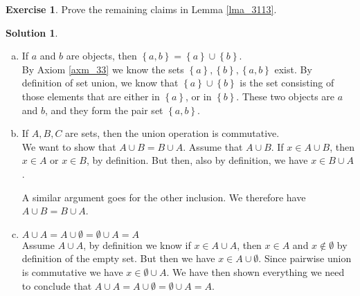 \documentclass[a4paper, twocolumn]{report}
\newcounter{exercise} \numberwithin{exercise}{section}
\theoremstyle{definition}
\newtheorem{exc}[exercise]{Exercise}
\theoremstyle{solution}
\newtheorem*{sltn}{Solution}
\newcommand{\union}{\cup}
\begin{document}
\begin{exc}
  Prove the remaining claims in Lemma \ref{lma_3113}.
\end{exc}
\begin{sltn}
  \begin{enumerate}[(a)]
    \item If $a$ and $b$ are objects, then $\left\{ a, b \right\} = \left\{ a \right\} \union \left\{ b \right\}$. \\
      [0.2cm]
      By Axiom \ref{axm_33} we know the sets $\left\{ a \right\}, \left\{ b
      \right\}, \left\{ a, b \right\}$ exist. By definition of set union, we
      know that $\left\{ a \right\} \union \left\{ b \right\}$ is the set
      consisting of those elements that are either in $\left\{ a \right\}$, or
      in $\left\{ b \right\}$. These two objects are $a$ and $b$, and they form
      the pair set $\left\{ a, b \right\}$. 

    \item If $A, B, C$ are sets, then the union operation is commutative. \\
      [0.2cm]
      We want to show that $A \union B = B \union A$.  Assume that $A \union
      B$. If $x \in A \union B$, then $x \in A$ or $x \in B$, by definition.
      But then, also by definition, we have $x \in B \union A$.  

      A similar argument goes for the other inclusion.  We therefore have $A
      \union B = B \union A$. 

    \item $A \union A = A \union \emptyset = \emptyset \union A = A$ \\
      [0.2cm]
      Assume $A \union A$, by definition we know if $x \in A \union A$, then $x
      \in A$ and $x \notin \emptyset$ by definition of the empty set. But then
      we have $x \in A \union \emptyset$.  Since pairwise union is commutative
      we have $x \in \emptyset \union A$. We have then shown everything we need
      to conclude that $A \union A = A \union \emptyset = \emptyset \union A =
      A$.
  \end{enumerate}
\end{sltn}
\end{document}
